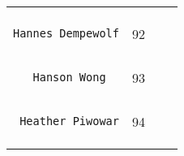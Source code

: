 \documentclass[]{article}
\begin{document}
\begin{longtable}[c]{@{}llll@{}}
\begin{minipage}[t]{0.13\columnwidth}
\end{minipage} & \begin{minipage}[t]{0.15\columnwidth}\raggedright
\end{minipage}
\\\noalign{\medskip}
\begin{minipage}[t]{0.39\columnwidth}\raggedright
\begin{verbatim}
Hannes Dempewolf
\end{verbatim}
\end{minipage} & \begin{minipage}[t]{0.10\columnwidth}\raggedright
92
\end{minipage} & \begin{minipage}[t]{0.13\columnwidth}\raggedright
\end{minipage} & \begin{minipage}[t]{0.15\columnwidth}\raggedright
\end{minipage}
\\\noalign{\medskip}
\begin{minipage}[t]{0.39\columnwidth}\raggedright
\begin{verbatim}
   Hanson Wong
\end{verbatim}
\end{minipage} & \begin{minipage}[t]{0.10\columnwidth}\raggedright
93
\end{minipage} & \begin{minipage}[t]{0.13\columnwidth}\raggedright
\end{minipage} & \begin{minipage}[t]{0.15\columnwidth}\raggedright
\end{minipage}
\\\noalign{\medskip}
\begin{minipage}[t]{0.39\columnwidth}\raggedright
\begin{verbatim}
 Heather Piwowar
\end{verbatim}
\end{minipage} & \begin{minipage}[t]{0.10\columnwidth}\raggedright
94
\end{minipage} & \begin{minipage}[t]{0.13\columnwidth}\raggedright
\end{minipage} & \begin{minipage}[t]{0.15\columnwidth}\raggedright
\end{minipage}
\\\noalign{\medskip}
\begin{minipage}[t]{0.39\columnwidth}\raggedright

\end{minipage}
\end{longtable}
\end{document}
